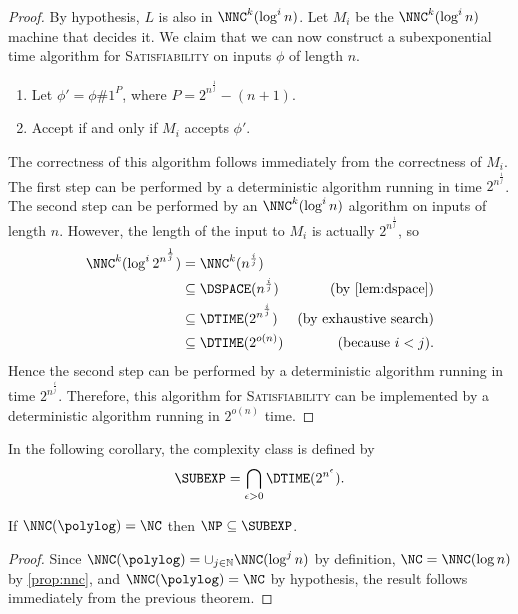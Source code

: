 \documentclass{article}
\begin{document}
\begin{proof}
  By hypothesis, $L$ is also in $\NNC^k(\log^i n)$.
  Let $M_i$ be the $\NNC^k(\log^i n)$ machine that decides it.
  We claim that we can now construct a subexponential time algorithm for \textsc{Satisfiability} on inputs $\phi$ of length $n$.
  \begin{enumerate}
  \item Let $\phi' = \phi \# 1^P$, where $P = 2^{n^{\frac{1}{j}}} - (n + 1)$.
  \item Accept if and only if $M_i$ accepts $\phi'$.
  \end{enumerate}
  The correctness of this algorithm follows immediately from the correctness of $M_i$.
  The first step can be performed by a deterministic algorithm running in time $2^{n^{\frac{1}{j}}}$.
  The second step can be performed by an $\NNC^k(\log^i n)$ algorithm on inputs of length $n$.
  However, the length of the input to $M_i$ is actually $2^{n^{\frac{1}{j}}}$, so
  \begin{align*}
    \NNC^k(\log^i{2^{n^{\frac{1}{j}}}}) & = \NNC^k(n^{\frac{i}{j}}) & \\
    & \subseteq \DSPACE(n^{\frac{i}{j}}) & \text{(by \autoref{lem:dspace})} \\
    & \subseteq \DTIME(2^{n^{\frac{i}{j}}}) & \text{(by exhaustive search)} \\
    & \subseteq \DTIME(2^{o(n)}) & \text{(because } i < j \text{).}
  \end{align*}
  Hence the second step can be performed by a deterministic algorithm running in time $2^{n^{\frac{i}{j}}}$.
  Therefore, this algorithm for \textsc{Satisfiability} can be implemented by a deterministic algorithm running in $2^{o(n)}$ time.
\end{proof}

In the following corollary, the complexity class \SUBEXP{} is defined by
\begin{equation*}
  \SUBEXP = \bigcap_{\epsilon > 0}{\DTIME(2^{n^{\epsilon}})}.
\end{equation*}

\begin{corollary}\label{cor:collapse}
  If $\NNC(\polylog) = \NC$ then $\NP \subseteq \SUBEXP$.
\end{corollary}
\begin{proof}
  Since $\NNC(\polylog) = \cup_{j \in \mathbb{N}}{\NNC(\log^j n)}$ by definition, $\NC = \NNC(\log n)$ by \autoref{prop:nnc}, and $\NNC(\polylog) = \NC$ by hypothesis, the result follows immediately from the previous theorem.
\end{proof}
\end{document}
